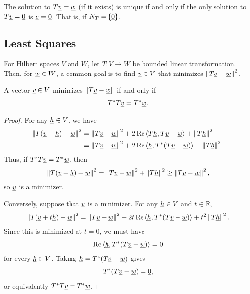 \begin{fact}
The solution to $T \underline{v} = \underline{w}$ (if it exists) is unique if and only if the only solution to $T \underline{v} = \underline{0}$ is $\underline{v} = \underline{0}$.
That is, if $N_T = \left\{ \underline{0} \right\}$.
\end{fact}

\subsection{Least Squares}

For Hilbert spaces $V$ and $W$, let $T\colon V\to W$ be bounded linear transformation.
Then, for $\underline w\in W$, a common goal is to find $\underline v\in V$ that minimizes $\left\| T \underline{v} - \underline{w} \right\|^2$.

\begin{theorem} \label{theorem:hilbert_lsq}
A vector $\underline{v} \in V$ minimizes $\left\| T \underline{v} - \underline{w} \right\|$ if and only if
\begin{equation*}
T^* T \underline{v} = T^* \underline{w}.
\end{equation*}
\end{theorem}
\begin{proof}
For any $\underline{h}\in V$, we have
\begin{align*}
\left\|T(\underline{v}+\underline{h})-\underline{w}\right\|^2
&=
\left\|T\underline{v}-\underline{w}\right\|^2
+2\,\mathrm{Re}\left\langle T\underline{h},T\underline{v}-\underline{w}\right\rangle
+\left\|T\underline{h}\right\|^2 \\
&=
\left\|T\underline{v}-\underline{w}\right\|^2
+2\,\mathrm{Re}\left\langle \underline{h},T^*(T\underline{v}-\underline{w})\right\rangle
+\left\|T\underline{h}\right\|^2.
\end{align*}
Thus, if $T^*T\underline{v}=T^*\underline{w}$, then
\[
\left\|T(\underline{v}+\underline{h})-\underline{w}\right\|^2
=
\left\|T\underline{v}-\underline{w}\right\|^2+\left\|T\underline{h}\right\|^2
\geq
\left\|T\underline{v}-\underline{w}\right\|^2,
\]
so $\underline{v}$ is a minimizer.

Conversely, suppose that $\underline{v}$ is a minimizer.  For any $\underline{h}\in V$ and $t\in\mathbb{R}$,
\[
\left\|T(\underline{v}+t\underline{h})-\underline{w}\right\|^2
=
\left\|T\underline{v}-\underline{w}\right\|^2
+2t\,\mathrm{Re}\left\langle \underline{h},T^*(T\underline{v}-\underline{w})\right\rangle
+t^2\left\|T\underline{h}\right\|^2.
\]
Since this is minimized at $t=0$, we must have
\[
\mathrm{Re}\left\langle \underline{h},T^*(T\underline{v}-\underline{w})\right\rangle=0
\]
for every $\underline{h}\in V$.  Taking
$\underline{h}=T^*(T\underline{v}-\underline{w})$ gives
\[
T^*(T\underline{v}-\underline{w})=\underline{0},
\]
or equivalently $T^*T\underline{v}=T^*\underline{w}$.
\end{proof}

